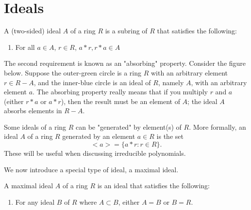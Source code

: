 \section{Ideals}
\begin{definition}
A (two-sided) ideal $A$ of a ring $R$ is a subring of $R$ that satisfies the following:

\begin{enumerate}
    \item For all $a\in A$, $r\in R$, $a*r, r*a \in A$
\end{enumerate}
\end{definition}

The second requirement is known as an "absorbing" property. Consider the figure below. Suppose the outer-green circle is a ring $R$ with an arbitrary element $r\in R - A$, and the inner-blue circle is an ideal of $R$, namely $A$, with an arbitrary element $a$. The absorbing property really means that if you multiply $r$ and $a$ (either $r*a$ or $a*r$), then the result must be an element of $A$; the ideal $A$ absorbs elements in $R - A$.


\begin{center}
\end{center}

Some ideals of a ring $R$ can be "generated" by element(s) of $R$. More formally, an ideal $A$ of a ring $R$ generated by an element $a \in R$ is the set $$<a> = \{a*r : r \in R\}.$$ 
\hspace{\parindent}These will be useful when discussing irreducible polynomials.

We now introduce a special type of ideal, a maximal ideal. 
\begin{definition}
A maximal ideal $A$ of a ring $R$ is an ideal that satisfies the following:
\begin{enumerate}
    \item For any ideal $B$ of $R$ where $A \subset B$, either $A = B$ or $B = R$.
\end{enumerate}
\end{definition}

